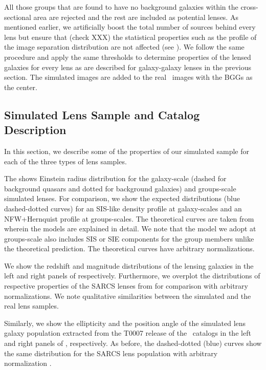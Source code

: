 \documentclass[useAMS,usenatbib,a4paper]{mn2e}
\begin{document}
All those groups that are found to have no background galaxies within the
cross-sectional area are rejected and the rest are included as potential lenses.
As mentioned earlier, we artificially boost the total number of sources behind
every lens but ensure that (check XXX) the statistical properties such as the profile of the
image separation distribution are not affected (see ). We
follow the same procedure and apply the same thresholds to determine properties
of the lensed galaxies for every lens as are described for galaxy-galaxy lenses
in the previous section. The simulated images are added to the real \cfhtls~images
with the BGGs as the center.


\subsection{Simulated Lens Sample and Catalog Description}

In this section, we describe some of the properties of our simulated sample for
each of the three types of lens samples.

The  shows Einstein radius distribution for the
galaxy-scale (dashed for background quasars and dotted for background galaxies)
and groups-scale simulated lenses. For comparison, we show the expected
distributions (blue dashed-dotted curves) for an SIS-like density profile at
galaxy-scales and an NFW+Hernquist profile at groups-scales. The 
theoretical curves are taken from \citep{More2012} wherein the models are
explained in detail. We note that the model we adopt at groups-scale also
includes SIS or SIE components for the group members unlike the theoretical
prediction. The theoretical curves have arbitrary normalizations.

We show the redshift and magnitude distributions of the lensing galaxies in the
left and right panels of 
respectively. Furthermore, we overplot the distributions of respective
properties of the SARCS lenses from \citep{More2012} for comparison with arbitrary
normalizations. We note qualitative similarities between the simulated and the
real lens samples.

Similarly, we show the ellipticity and the position angle of the simulated lens
galaxy population extracted from the T0007 release of the \cfhtls~catalogs in the
left and right panels of , respectively. As before, the
dashed-dotted (blue) curves show the same distribution for the SARCS lens
population with arbitrary normalization \citep{More2012}.
\end{document}
